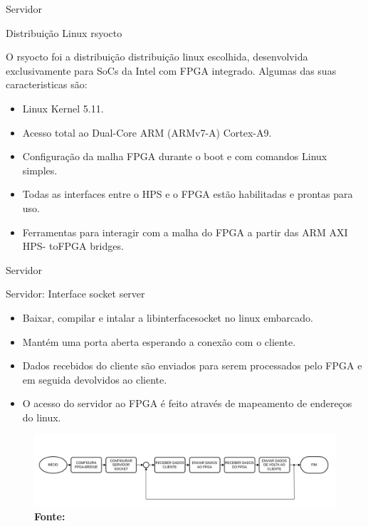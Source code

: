 \documentclass[10pt]{beamer}
\begin{document}
\begin{frame}{Servidor}
	\begin{alertblock}{Distribuição Linux rsyocto}
		\vspace{0.1cm}
		\begin{justify}
			O rsyocto foi a distribuição distribuição linux escolhida, desenvolvida exclusivamente para SoCs da Intel com FPGA integrado. Algumas das suas caracteristicas são:
		\end{justify}
		\begin{itemize}
			\item Linux Kernel 5.11.
			\item Acesso total ao Dual-Core ARM (ARMv7-A) Cortex-A9.
			\item Configuração da malha FPGA durante o boot e com comandos Linux simples.
			\item Todas as interfaces entre o HPS e o FPGA estão habilitadas e prontas para uso.
			\item Ferramentas para interagir com a malha do FPGA a partir das ARM AXI HPS-
			toFPGA bridges.
		\end{itemize}
	\end{alertblock}
\end{frame}

\begin{frame}{Servidor}
    \begin{alertblock}{Servidor: Interface socket server}
		\vspace{0.3cm}
		\begin{itemize}
			\item Baixar, compilar e intalar a libinterfacesocket no linux embarcado.
			\item Mantém uma porta aberta esperando a conexão com o cliente.
			\item Dados recebidos do cliente são enviados para serem processados pelo FPGA e em seguida devolvidos ao cliente.
			\item O acesso do servidor ao FPGA é feito através de mapeamento de endereços do
			linux.
		\end{itemize}
		\begin{figure}[h]
			\begin{center}
				\includegraphics[scale=0.28]{imagens/fluxogramaServidor.png}\\
				{\footnotesize \textbf{Fonte:}}
			\end{center}
			\label{fig:servidor}
		\end{figure}
	\end{alertblock}
\end{frame}
\end{document}
